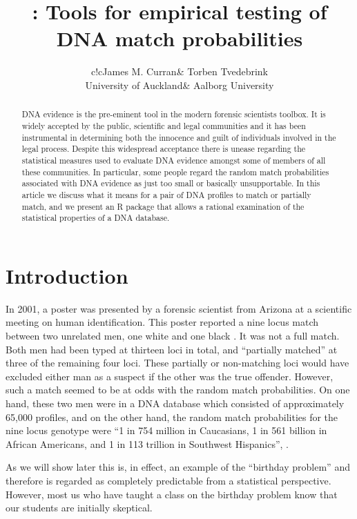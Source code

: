 \documentclass[a4paper,11pt]{article}
\author{\begin{tabular}{c!{\hspace{10mm}}c}James M. Curran& Torben Tvedebrink \\University of
  Auckland& Aalborg University\end{tabular}}
\title{\pkg{DNAtools} : Tools for empirical testing of DNA match probabilities}
\date{}
\newcommand{\proglang}[1]{\textsf{#1}}
\begin{document}



\maketitle

\begin{abstract}
  DNA evidence is the pre-eminent tool in the modern forensic scientists
toolbox. It is widely accepted by the public, scientific and legal
communities and it has been instrumental in determining both the innocence
and guilt of individuals involved in the legal process. Despite this
widespread acceptance there
is unease regarding the statistical measures used to evaluate DNA
evidence amongst some of members of all these communities. In particular,
some people regard the random match probabilities associated with
DNA evidence as just too small or basically unsupportable. In this
article we discuss what it means for a pair of DNA profiles to match
or partially match, and we  present an \proglang{R} package that allows a rational
examination of the statistical properties of a DNA database.
\end{abstract}

\section[Introduction]{Introduction}
\label{sec:introduction}
In 2001, a poster was presented by a forensic scientist from Arizona
\citep{troyer2001} at a scientific meeting on human
identification. This poster reported a nine locus match between two
unrelated men, one white and one black \citep{kaye2009}.  It was not a
full match. Both men had been typed at thirteen loci in total, and
``partially matched'' at three of the remaining four loci. These
partially or non-matching loci would have excluded either man as a
suspect if the other was the true offender. However, such a match
seemed to be at odds with the random match probabilities. On one hand,
these two men were in a DNA database which consisted of approximately
65,000 profiles, and on the other hand, the random match probabilities
for the nine locus genotype were ``1 in 754 million in Caucasians, 1
in 561 billion in African Americans, and 1 in 113 trillion in
Southwest Hispanics'', \citet{troyer2001}.

As we will show later this is, in effect, an example of the ``birthday
problem'' and therefore is regarded as completely predictable from a
statistical perspective. However, most us who have taught a class on
the birthday problem know that our students are initially skeptical. 
\end{document}
